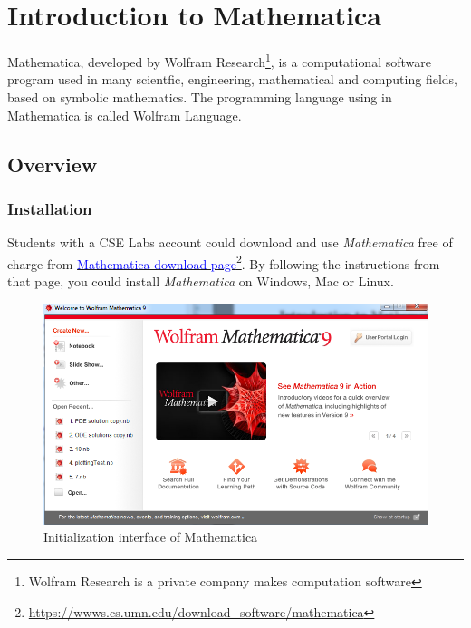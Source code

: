 
\chapter{Introduction to Mathematica}
Mathematica, developed by Wolfram Research\footnote{Wolfram Research is a private company makes computation software}, is a computational software program used in many scientfic, engineering, mathematical and computing fields, based on symbolic mathematics\cite{website:wiki-mathematica}. The programming language using in Mathematica is called Wolfram Language.

\section{Overview}
\subsection{Installation}
Students with a CSE Labs account could download and use \emph{Mathematica} free of charge from \href{https://wwws.cs.umn.edu/download_software/mathematica}{\textcolor{blue} {Mathematica download page}}\footnote{\url{https://wwws.cs.umn.edu/download_software/mathematica}}. By following the instructions from that page, you could install \emph{Mathematica} on Windows, Mac or Linux. 

\begin{figure}[h!]
  \centering
    \includegraphics[scale=0.4]{figures/mathematica}
  \caption{Initialization interface of Mathematica}
  \label{fig:mathematica}
\end{figure}

